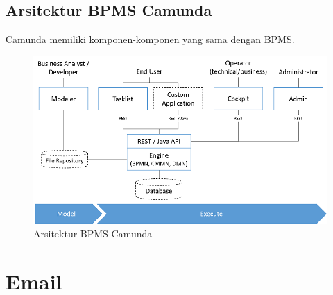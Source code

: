 {\subsection{Arsitektur BPMS Camunda}
Camunda memiliki komponen-komponen yang sama dengan BPMS. 
\begin{figure}[H]
	\centering
	\includegraphics[scale=0.5]{Gambar/Bab-2/bpms/arsitektur-camunda}
	\caption{Arsitektur BPMS Camunda} 
	\label{fig:arsitekturcamunda}
\end{figure}


\section{Email}







		
	

 
}
